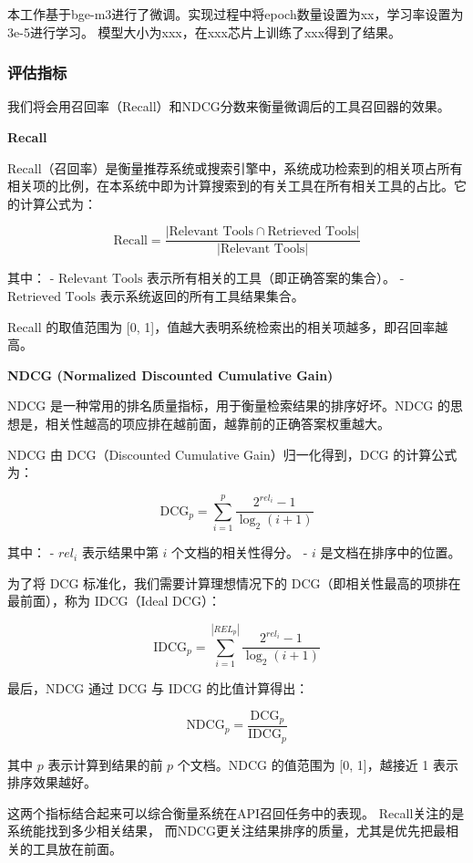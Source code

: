本工作基于bge-m3进行了微调。实现过程中将epoch数量设置为xx，学习率设置为3e-5进行学习。
模型大小为xxx，在xxx芯片上训练了xxx得到了结果。

\subsubsection{评估指标}

我们将会用召回率（Recall）和NDCG分数来衡量微调后的工具召回器的效果。

\textbf{Recall}

Recall（召回率）是衡量推荐系统或搜索引擎中，系统成功检索到的相关项占所有相关项的比例，在本系统中即为计算搜索到的有关工具在所有相关工具的占比。它的计算公式为：

\[
\text{Recall} = \frac{|\text{Relevant Tools} \cap \text{Retrieved Tools}|}{|\text{Relevant Tools}|}
\]

其中：
- \(\text{Relevant Tools}\) 表示所有相关的工具（即正确答案的集合）。
- \(\text{Retrieved Tools}\) 表示系统返回的所有工具结果集合。

Recall 的取值范围为 [0, 1]，值越大表明系统检索出的相关项越多，即召回率越高。

\textbf{NDCG (Normalized Discounted Cumulative Gain)}

NDCG 是一种常用的排名质量指标，用于衡量检索结果的排序好坏。NDCG 的思想是，相关性越高的项应排在越前面，越靠前的正确答案权重越大。

NDCG 由 DCG（Discounted Cumulative Gain）归一化得到，DCG 的计算公式为：

\[
\text{DCG}_p = \sum_{i=1}^{p} \frac{2^{rel_i} - 1}{\log_2(i + 1)}
\]

其中：
- \(rel_i\) 表示结果中第 \(i\) 个文档的相关性得分。
- \(i\) 是文档在排序中的位置。

为了将 DCG 标准化，我们需要计算理想情况下的 DCG（即相关性最高的项排在最前面），称为 IDCG（Ideal DCG）：

\[
\text{IDCG}_p = \sum_{i=1}^{|REL_p|} \frac{2^{rel_i} - 1}{\log_2(i + 1)}
\]

最后，NDCG 通过 DCG 与 IDCG 的比值计算得出：

\[
\text{NDCG}_p = \frac{\text{DCG}_p}{\text{IDCG}_p}
\]

其中 \(p\) 表示计算到结果的前 \(p\) 个文档。NDCG 的值范围为 [0, 1]，越接近 1 表示排序效果越好。

这两个指标结合起来可以综合衡量系统在API召回任务中的表现。
Recall关注的是系统能找到多少相关结果，
而NDCG更关注结果排序的质量，尤其是优先把最相关的工具放在前面。

